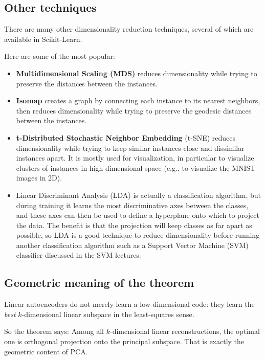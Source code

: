 \documentclass[%
oneside,                 %
final,                   %
10pt]{article}
\begin{document}
\epycod


\subsection{Other techniques}

There are many other dimensionality reduction techniques, several of which are available in Scikit-Learn.

Here are some of the most popular:
\begin{itemize}
\item \textbf{Multidimensional Scaling (MDS)} reduces dimensionality while trying to preserve the distances between the instances.

\item \textbf{Isomap} creates a graph by connecting each instance to its nearest neighbors, then reduces dimensionality while trying to preserve the geodesic distances between the instances.

\item \textbf{t-Distributed Stochastic Neighbor Embedding} (t-SNE) reduces dimensionality while trying to keep similar instances close and dissimilar instances apart. It is mostly used for visualization, in particular to visualize clusters of instances in high-dimensional space (e.g., to visualize the MNIST images in 2D).

\item Linear Discriminant Analysis (LDA) is actually a classification algorithm, but during training it learns the most discriminative axes between the classes, and these axes can then be used to define a hyperplane onto which to project the data. The benefit is that the projection will keep classes as far apart as possible, so LDA is a good technique to reduce dimensionality before running another classification algorithm such as a Support Vector Machine (SVM) classifier discussed in the SVM lectures.
\end{itemize}

\noindent
\subsection{Geometric meaning of the theorem}

Linear autoencoders do not merely learn a low-dimensional code:
they learn the \emph{best} \(k\)-dimensional linear subspace in the least-squares sense.

\begin{block}{So the theorem says: }
Among all \(k\)-dimensional linear reconstructions, the optimal one is orthogonal projection onto the principal subspace.
That is exactly the geometric content of PCA.
\end{block}
\end{document}
